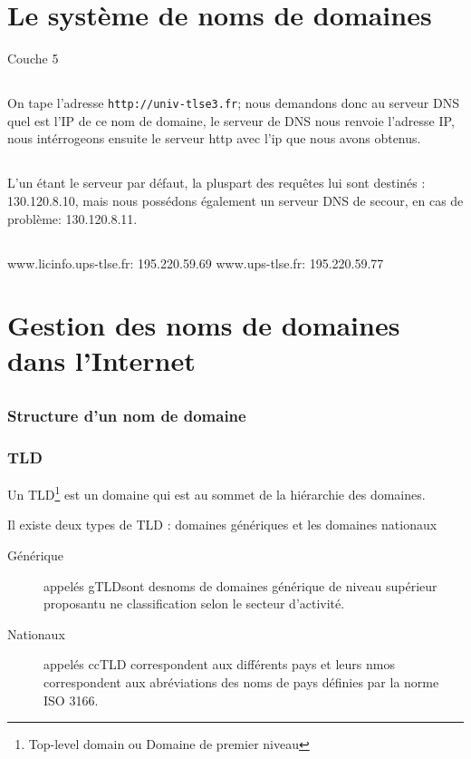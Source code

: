 \documentclass[a4paper, 11pt]{article}
\begin{document}
	\maketitle
	\section{Le système de noms de domaines}
	Couche 5
	\subsection{}
	On tape l'adresse \texttt{http://univ-tlse3.fr}; nous demandons donc au serveur DNS quel est l'IP de ce nom de domaine, le serveur de DNS nous
	renvoie l'adresse IP, nous intérrogeons ensuite le serveur http avec l'ip que nous avons obtenus.
	\subsection{}
		L'un étant le serveur par défaut, la pluspart des requêtes lui sont destinés : 130.120.8.10, mais nous possédons également un serveur DNS de
		secour, en cas de problème: 130.120.8.11.
		\subsection{}
		www.licinfo.ups-tlse.fr: 195.220.59.69
		www.ups-tlse.fr: 195.220.59.77
	\section{Gestion des noms de domaines dans l'Internet}
	\subsection{}
	\subsubsection{Structure d'un nom de domaine}
	\subsubsection{TLD}
	Un TLD\footnote{Top-level domain ou Domaine de premier niveau} est un domaine qui est au sommet de la hiérarchie des domaines. 

	Il existe deux types de TLD : domaines génériques et les domaines nationaux
	\begin{description}
		\item[Générique]appelés gTLDsont desnoms de domaines générique de niveau supérieur proposantu ne classification selon le secteur d'activité.
		\item[Nationaux] appelés ccTLD correspondent aux différents pays et leurs nmos correspondent aux abréviations des noms de pays définies par la
			norme ISO 3166.
	\end{description}
\end{document}
